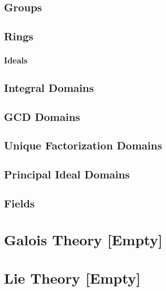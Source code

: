 \documentclass[12pt, english]{book}
\begin{document}
	\chapter{Groups} \label{Groups Chapter - Abstract Algebra}
	
	
	\chapter{Rings} \label{Rings Chapter - Abstract Algebra}
	
	\section{Ideals} \label{Ideals Section - Abstract Algebra}
	
	\chapter{Integral Domains} \label{Integral Domains Chapter - Abstract Algebra}
	
	\chapter{GCD Domains} \label{GCD Domains Chapter - Abstract Algebra}
	
	\chapter{Unique Factorization Domains} \label{Unique Factorization Domains Chapter - Abstract Algebra}
	
	\chapter{Principal Ideal Domains} \label{Principal Ideal Domains Chapter - Abstract Algebra}
	
	\chapter{Fields} \label{Fields Chapter - Abstract Algebra}
	
	
	\part{Galois Theory [Empty]} \label{Galois Theory Part}
	
	\part{Lie Theory [Empty]} \label{Lie Algebra Part}
	
\end{document}
